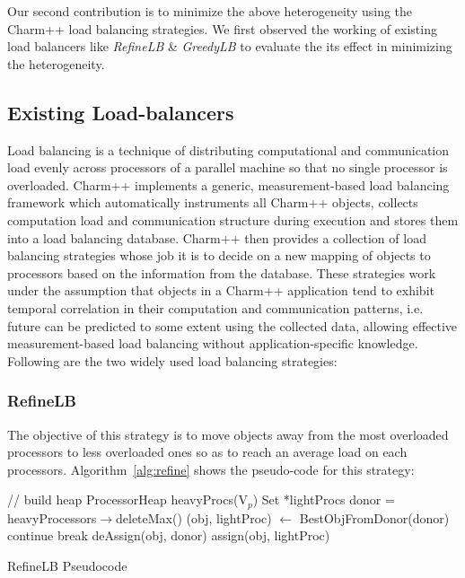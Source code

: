 Our second contribution is to minimize the above heterogeneity using the
Charm++ load balancing strategies.  We first observed the working of existing load
balancers like \emph{RefineLB} \& \emph{GreedyLB} to evaluate the its effect in
minimizing the heterogeneity. 
 
\subsection{Existing Load-balancers} 
Load balancing is a technique of distributing computational and communication
load evenly across processors of a parallel machine so that no single processor
is overloaded.  Charm++ implements a generic, measurement-based load balancing
framework which automatically instruments all Charm++ objects, collects
computation load and communication structure during execution and stores them
into a load balancing database.  Charm++ then provides a collection of load
balancing strategies whose job it is to decide on a new mapping of objects to
processors based on the information from the database.  These strategies work
under the assumption that objects in a Charm++ application tend to exhibit
temporal correlation in their computation and communication patterns, i.e.
future can be predicted to some extent using the collected data, allowing
effective measurement-based load balancing without application-specific
knowledge. Following are the two widely used load balancing strategies:

\subsubsection{RefineLB}
The objective of this strategy is to move objects away from the most overloaded
processors to less overloaded ones so as to reach an average load on each
processors. Algorithm~\ref{alg:refine} shows the pseudo-code for this strategy:

\begin{algorithm}
 // build heap \;
  ProcessorHeap heavyProcs(V$_p$)\;
  Set *lightProcs\;
   {
    donor =   heavyProcessors$\rightarrow$deleteMax()\;
     {
      (obj, lightProc)  $\leftarrow$ BestObjFromDonor(donor)\;
       {
        continue\;
      } 
       {
        break\;
      }
      deAssign(obj, donor)\;
      assign(obj, lightProc)\;
    }
  }
 \caption{RefineLB Pseudocode}
 \label{alg:refine}
\end{algorithm}

